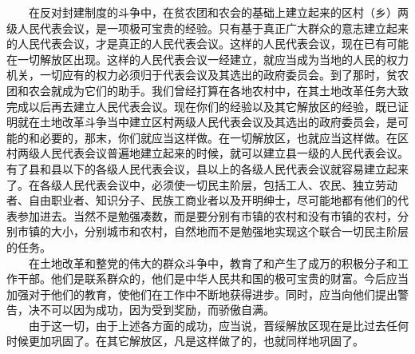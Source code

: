 \documentclass[cn,11pt,chinese]{elegantbook}
\begin{document}
　　在反对封建制度的斗争中，在贫农团和农会的基础上建立起来的区村（乡）两级人民代表会议，是一项极可宝贵的经验。只有基于真正广大群众的意志建立起来的人民代表会议，才是真正的人民代表会议。这样的人民代表会议，现在已有可能在一切解放区出现。这样的人民代表会议一经建立，就应当成为当地的人民的权力机关，一切应有的权力必须归于代表会议及其选出的政府委员会。到了那时，贫农团和农会就成为它们的助手。我们曾经打算在各地农村中，在其土地改革任务大致完成以后再去建立人民代表会议。现在你们的经验以及其它解放区的经验，既已证明就在土地改革斗争当中建立区村两级人民代表会议及其选出的政府委员会，是可能的和必要的，那末，你们就应当这样做。在一切解放区，也就应当这样做。在区村两级人民代表会议普遍地建立起来的时候，就可以建立县一级的人民代表会议。有了县和县以下的各级人民代表会议，县以上的各级人民代表会议就容易建立起来了。在各级人民代表会议中，必须使一切民主阶层，包括工人、农民、独立劳动者、自由职业者、知识分子、民族工商业者以及开明绅士，尽可能地都有他们的代表参加进去。当然不是勉强凑数，而是要分别有市镇的农村和没有市镇的农村，分别市镇的大小，分别城市和农村，自然地而不是勉强地实现这个联合一切民主阶层的任务。\\
　　在土地改革和整党的伟大的群众斗争中，教育了和产生了成万的积极分子和工作干部。他们是联系群众的，他们是中华人民共和国的极可宝贵的财富。今后应当加强对于他们的教育，使他们在工作中不断地获得进步。同时，应当向他们提出警告，决不可以因为成功，因为受到奖励，而骄傲自满。\\
　　由于这一切，由于上述各方面的成功，应当说，晋绥解放区现在是比过去任何时候更加巩固了。在其它解放区，凡是这样做了的，也就同样地巩固了。\\
\end{document}
